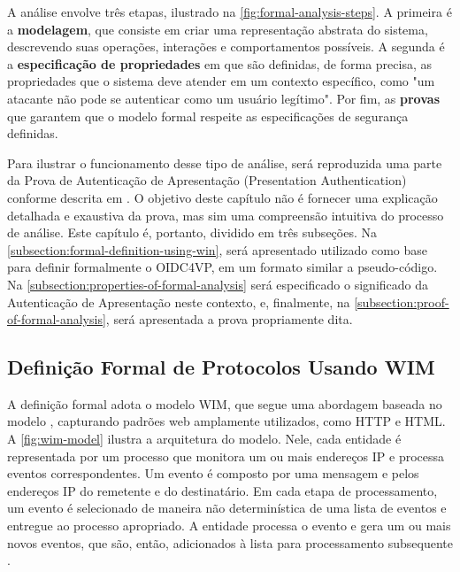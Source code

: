 A análise envolve três etapas, ilustrado na \autoref{fig:formal-analysis-steps}. A primeira é a \textbf{modelagem}, que consiste em criar uma representação abstrata do sistema, descrevendo suas operações, interações e comportamentos possíveis. A segunda é a \textbf{especificação de propriedades} em que são definidas, de forma precisa, as propriedades que o sistema deve atender em um contexto específico, como "um atacante não pode se autenticar como um usuário legítimo". Por fim, as \textbf{provas} que garantem que o modelo formal respeite as especificações de segurança definidas.



Para ilustrar o funcionamento desse tipo de análise, será reproduzida uma parte da Prova de Autenticação de Apresentação (Presentation Authentication) conforme descrita em \cite{hauck2023openid}. O objetivo deste capítulo não é fornecer uma explicação detalhada e exaustiva da prova, mas sim uma compreensão intuitiva do processo de análise. Este capítulo é, portanto, dividido em três subseções. Na \autoref{subsection:formal-definition-using-win}, será apresentado  utilizado como base para definir formalmente o \acs{OIDC4VP}, em um formato similar a pseudo-código. Na \autoref{subsection:properties-of-formal-analysis} será especificado o significado da Autenticação de Apresentação neste contexto, e, finalmente, na \autoref{subsection:proof-of-formal-analysis}, será apresentada a prova propriamente dita.

\subsection{Definição Formal de Protocolos Usando \acs{WIM}}\label{subsection:formal-definition-using-win}

A definição formal adota o modelo \acs{WIM}, que segue uma abordagem baseada no modelo , capturando padrões web amplamente utilizados, como HTTP e HTML. A \autoref{fig:wim-model} ilustra a arquitetura do modelo. Nele, cada entidade é representada por um processo que monitora um ou mais endereços IP e processa eventos correspondentes. Um evento é composto por uma mensagem e pelos endereços IP do remetente e do destinatário. Em cada etapa de processamento, um evento é selecionado de maneira não determinística de uma lista de eventos e entregue ao processo apropriado. A entidade processa o evento e gera um ou mais novos eventos, que são, então, adicionados à lista para processamento subsequente \cite{fett2024wim}.

